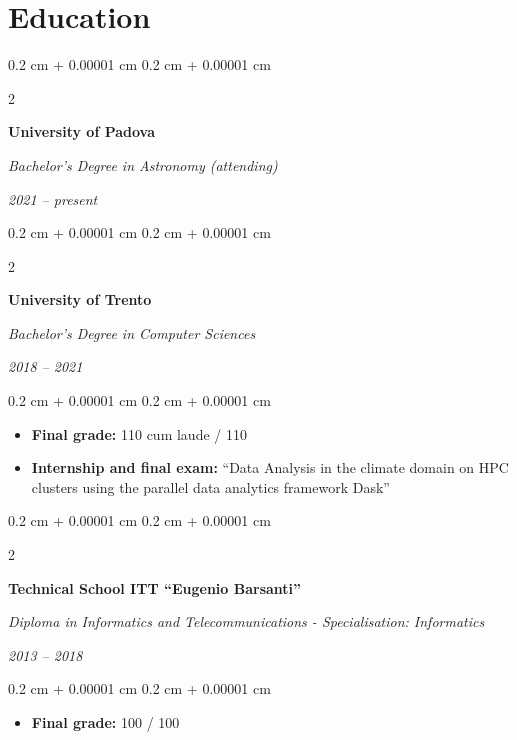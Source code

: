 \documentclass[10pt, a4paper]{article}
\newenvironment{highlights}{
    \begin{itemize}[
        topsep=0.10 cm,
        parsep=0.10 cm,
        partopsep=0pt,
        itemsep=0pt,
        leftmargin=0.4 cm + 10pt
    ]
}{
    \end{itemize}
} %
\newenvironment{onecolentry}{
    \begin{adjustwidth}{
        0.2 cm + 0.00001 cm
    }{
        0.2 cm + 0.00001 cm
    }
}{
    \end{adjustwidth}
} %
\newenvironment{twocolentry}[2][]{
    \onecolentry
    \def\secondColumn{#2}
    \setcolumnwidth{\fill, 6.5 cm}
    \begin{paracol}{2}
}{
    \switchcolumn \raggedleft \secondColumn
    \end{paracol}
    \endonecolentry
} %
\begin{document}
    
    \section{Education}



        
        \begin{twocolentry}{
            
            
        \textit{2021 – present}}
            \textbf{University of Padova}

            \textit{Bachelor's Degree in Astronomy (attending)}
        \end{twocolentry}



        \vspace{0.4 cm}

        \begin{twocolentry}{
            
            
        \textit{2018 – 2021}}
            \textbf{University of Trento}

            \textit{Bachelor's Degree in Computer Sciences}
        \end{twocolentry}

        \vspace{0.10 cm}
        \begin{onecolentry}
            \begin{highlights}
                \item \textbf{Final grade:} 110 cum laude / 110
                \item \textbf{Internship and final exam:} “Data Analysis in the climate domain on HPC clusters using the parallel data analytics framework Dask”
            \end{highlights}
        \end{onecolentry}


        \vspace{0.4 cm}

        \begin{twocolentry}{
            
            
        \textit{2013 – 2018}}
            \textbf{Technical School ITT “Eugenio Barsanti”}

            \textit{Diploma in Informatics and Telecommunications - Specialisation: Informatics}
        \end{twocolentry}

        \vspace{0.10 cm}
        \begin{onecolentry}
            \begin{highlights}
                \item \textbf{Final grade:} 100 / 100
            \end{highlights}
        \end{onecolentry}
\end{document}
